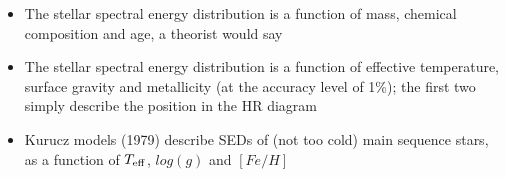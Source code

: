 \documentclass[letterpaper,landscape]{slides}
\begin{document}
\begin{slide}
{\begin{minipage}[t]{12cm}
\begin{itemize}
\item {\color{blue} The stellar spectral energy distribution} is a function of 
      mass, chemical composition and age, a theorist would say
\item {\color{blue} The stellar spectral energy distribution} is a function of 
      effective temperature, surface gravity and metallicity (at the accuracy 
      level of 1\%); the first two simply describe the position in the HR diagram
\item {\color{blue} Kurucz models (1979)} describe SEDs of (not too cold) main
        sequence stars, as a function of $T_{\rm eff}$, $log(g)$ and $[Fe/H]$
\end{itemize}

\end{minipage}}
\vfill 
\end{slide}
\end{document}

